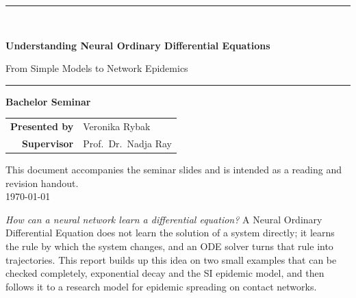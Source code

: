 \documentclass[11pt,a4paper]{article}
\newcommand{\figph}[2]{%
  \fbox{\parbox[c][3.2cm][c]{\dimexpr#1-2\fboxsep-2\fboxrule\relax}{%
    \centering\small\ttfamily [figure: #2]}}}
\begin{document}
\hypersetup{pageanchor=false}

\begin{titlepage}
\centering
\vspace*{0.8cm}

\figph{4cm}{KU\_Logo.png}

\vfill

\rule{\linewidth}{0.5pt}\\[0.7cm]
{\Huge\bfseries Understanding Neural Ordinary Differential Equations\par}
\vspace{0.5cm}
{\LARGE From Simple  Models to Network Epidemics\par}
\vspace{0.7cm}
\rule{\linewidth}{0.5pt}

\vfill

{\large\bfseries Bachelor Seminar}\\[1.6cm]

\begin{tabular}{rl}
\textbf{Presented by} & Veronika Rybak \\[4pt]
\textbf{Supervisor}   & Prof.\ Dr.\ Nadja Ray \\
\end{tabular}

\vfill
{\footnotesize This document accompanies the seminar slides and is intended as a reading and revision handout.}\\[0.3cm]
{\footnotesize\today}
\end{titlepage}

\hypersetup{pageanchor=true}

\tableofcontents
\newpage
{}

\begin{kaobox}[title=Central question of the seminar]
\emph{How can a neural network learn a differential equation?}
A Neural Ordinary Differential Equation does not learn the solution of a system
directly; it learns the rule by which the system changes, and an ODE solver turns
that rule into trajectories. This report builds up this idea on two small
examples that can be checked completely, exponential decay and the SI epidemic
model, and then follows it to a research model for epidemic spreading on contact
networks.
\end{kaobox}
\end{document}
